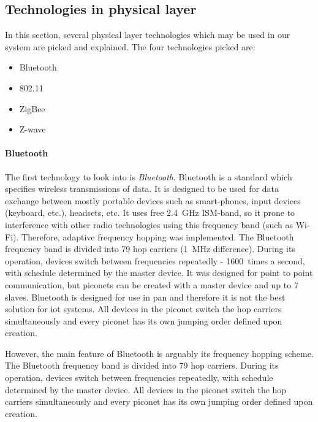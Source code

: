 \subsection{Technologies in physical layer}

In this section, several physical layer technologies which may be used in our system are picked and explained. The four technologies picked are: 
\begin{itemize}[noitemsep]
    \item Bluetooth
    \item 802.11
    \item ZigBee
    \item Z-wave
\end{itemize}

\paragraph{Bluetooth}
The first technology to look into is \textit{Bluetooth}. Bluetooth is a standard which specifies wireless transmissions of data. It is designed to be used for data exchange between mostly portable devices such as smart-phones, input devices (keyboard, etc.), headsets, etc. It uses free 2.4~GHz ISM-band, so it prone to interference with other radio technologies using this frequency band (such as Wi-Fi). Therefore, adaptive frequency hopping was implemented. The Bluetooth frequency band is divided into 79 hop carriers (1~MHz difference). During its operation, devices switch between frequencies repeatedly - 1600~times a second, with schedule determined by the master device. It was designed for point to point communication, but piconets can be created with a master device and up to 7 slaves. Bluetooth is designed for use in \acrfull{pan} and therefore it is not the best solution for \acrshort{iot} systems. All devices in the piconet switch the hop carriers simultaneously and every piconet has its own jumping order defined upon creation.

However, the main feature of Bluetooth is arguably its frequency hopping scheme. The Bluetooth frequency band is divided into 79 hop carriers. During its operation, devices switch between frequencies repeatedly, with schedule determined by the master device. All devices in the piconet switch the hop carriers simultaneously and every piconet has its own jumping order defined upon creation.
% 
